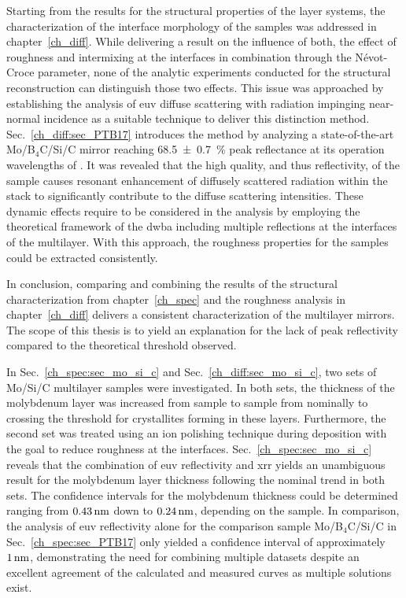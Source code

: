 Starting from the results for the structural properties of the layer systems, the characterization of the interface morphology of the samples was addressed in chapter~\ref{ch_diff}. While delivering a result on the influence of both, the effect of roughness and intermixing at the interfaces in combination through the N{\'e}vot-Croce parameter, none of the analytic experiments conducted for the structural reconstruction can distinguish those two effects. This issue was approached by establishing the analysis of \gls{euv} diffuse scattering with radiation impinging near-normal incidence as a suitable technique to deliver this distinction method. Sec.~\ref{ch_diff:sec_PTB17} introduces the method by analyzing a state-of-the-art Mo/B$_4$C/Si/C mirror reaching \SI{68.5 \pm 0.7}{\percent} peak reflectance at its operation wavelengths of . It was revealed that the high quality, and thus reflectivity, of the sample causes resonant enhancement of diffusely scattered radiation within the stack to significantly contribute to the diffuse scattering intensities. These dynamic effects require to be considered in the analysis by employing the theoretical framework of the \glsdesc{dwba} including multiple reflections at the interfaces of the multilayer. With this approach, the roughness properties for the samples could be extracted consistently.

In conclusion, comparing and combining the results of the structural characterization from chapter~\ref{ch_spec} and the roughness analysis in chapter~\ref{ch_diff} delivers a consistent characterization of the multilayer mirrors. The scope of this thesis is to yield an explanation for the lack of peak reflectivity compared to the theoretical threshold observed.

In Sec.~\ref{ch_spec:sec_mo_si_c} and Sec.~\ref{ch_diff:sec_mo_si_c}, two sets of Mo/Si/C multilayer samples were investigated. In both sets, the thickness of the molybdenum layer was increased from sample to sample from nominally  to  crossing the threshold for crystallites forming in these layers. Furthermore, the second set was treated using an ion polishing technique during deposition with the goal to reduce roughness at the interfaces. Sec.~\ref{ch_spec:sec_mo_si_c} reveals that the combination of \gls{euv} reflectivity and \glsdesc{xrr} yields an unambiguous result for the molybdenum layer thickness following the nominal trend in both sets. The confidence intervals for the molybdenum thickness could be determined ranging from $\nm{0.43}$ down to $\nm{0.24}$, depending on the sample. In comparison, the analysis of \gls{euv} reflectivity alone for the comparison sample Mo/B$_4$C/Si/C in Sec.~\ref{ch_spec:sec_PTB17} only yielded a confidence interval of approximately $\nm{1}$, demonstrating the need for combining multiple datasets despite an excellent agreement of the calculated and measured curves as multiple solutions exist.

